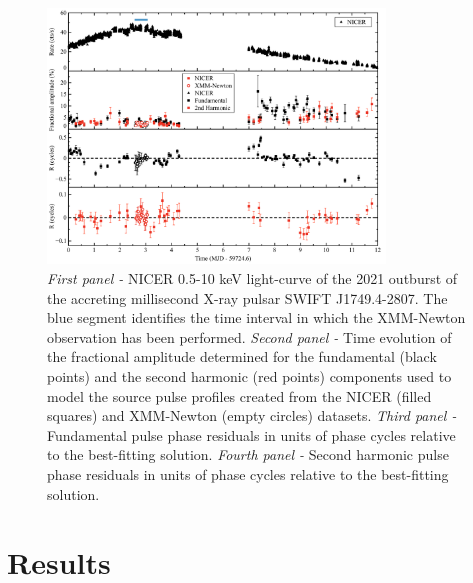 \documentclass[fleqn,usenatbib]{mnras}
\newcommand{\swiftj}{SWIFT J1749.4-2807}
\newcommand{\nicer}{NICER}
\newcommand{\xmm}{XMM-Newton}
\begin{document}
\begin{figure}
\centering
\includegraphics[width=0.8\textwidth]{plot_lc_phase_residuals}
\caption{\textit{First panel -} \nicer{} 0.5-10 keV light-curve of the 2021 outburst of the accreting millisecond X-ray pulsar \swiftj{}. The blue segment identifies the time interval in which the \xmm{} observation has been performed. \textit{Second panel -} Time evolution of the fractional amplitude determined for the fundamental (black points) and the second harmonic (red points) components used to model the source pulse profiles created from the \nicer{} (filled squares) and \xmm{} (empty circles) datasets. \textit{Third panel -} Fundamental pulse phase residuals in units of phase cycles relative to the best-fitting solution. \textit{Fourth panel -} Second harmonic pulse phase residuals in units of phase cycles relative to the best-fitting solution.}
\label{fig:phase_fit}
\end{figure} 




\section{Results}
\end{document}
